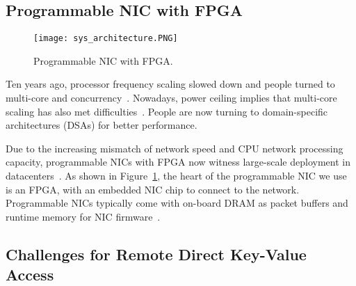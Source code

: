 \subsection{Programmable NIC with FPGA}
\label{sec:programmable-nic}

\begin{figure}[t]
\centering
\texttt{[image: sys\_architecture.PNG]}
\caption{Programmable NIC with FPGA.}
\label{fig:kvdirect-arch}
\vspace{-15pt}
\end{figure}

Ten years ago, processor frequency scaling slowed down and people turned to multi-core and concurrency~\cite{sutter2005free}.
Nowadays, power ceiling implies that multi-core scaling has also met difficulties~\cite{esmaeilzadeh2013power}.
People are now turning to domain-specific architectures (DSAs) for better performance.


Due to the increasing mismatch of network speed and CPU network processing capacity, programmable NICs with FPGA now witness large-scale deployment in datacenters~\cite{vfp,greenberg2015sdn,li2016clicknp}.
As shown in Figure~\ref{fig:kvdirect-arch}, the heart of the programmable NIC we use~\cite{li2016clicknp} is an FPGA, with an embedded NIC chip to connect to the network.
Programmable NICs typically come with on-board DRAM as packet buffers and runtime memory for NIC firmware~\cite{putnam2014reconfigurable,li2016clicknp}.

\subsection{Challenges for Remote Direct Key-Value Access}
\label{sec:challenge}

